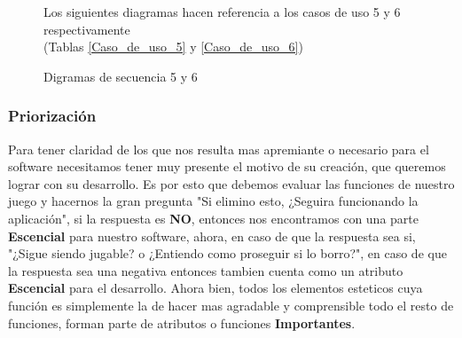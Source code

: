 \begin{figure}[H]
	\centering
	Los siguientes diagramas hacen referencia a los casos de uso 5 y 6 respectivamente\\(Tablas \ref{Caso_de_uso_5} y \ref{Caso_de_uso_6})
 	\caption{Digramas de secuencia 5 y 6}
\end{figure}

\subsubsection{Priorización}
Para tener claridad de los que nos resulta mas apremiante o necesario para el software necesitamos tener muy presente el motivo de su creación, que queremos lograr con su desarrollo. Es por esto que debemos evaluar las funciones de nuestro juego y hacernos la gran pregunta "Si elimino esto, ¿Seguira funcionando la aplicación", si la respuesta es \textbf{NO}, entonces nos encontramos con una parte \textbf{Escencial} para nuestro software, ahora, en caso de que la respuesta sea si,  "¿Sigue siendo jugable? o ¿Entiendo como proseguir si lo borro?", en caso de que la respuesta sea una negativa entonces tambien cuenta como un atributo \textbf{Escencial} para el desarrollo.
Ahora bien, todos los elementos esteticos cuya función es simplemente la de hacer mas agradable y comprensible todo el resto de funciones, forman parte de atributos o funciones \textbf{Importantes}.

